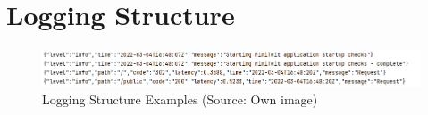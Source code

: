 \section{Logging Structure}\label{app:logging_structure}

\begin{figure}[H]
    \centering
    \includegraphics[width = \linewidth]{images/logging/logging_structure_1.png}
    \caption{Logging Structure Examples (Source: Own image)}
\end{figure}